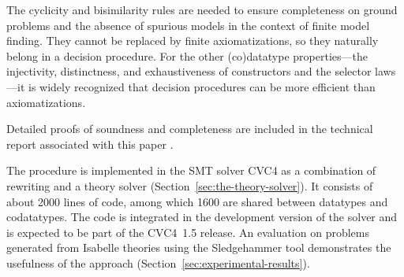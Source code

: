 
The cyclicity and bisimilarity rules are
needed to ensure completeness on ground problems and the absence of spurious
models in the context of finite model finding.
They cannot be replaced by finite
axiomatizations, so they naturally belong in a decision procedure. 
For the other (co)datatype properties---the injectivity, distinctness, and
exhaustiveness of constructors and the selector laws---it is
widely recognized that decision procedures can be more efficient than
axiomatizations.

\begin{paper}
Detailed proofs of soundness and completeness are included in the technical report
associated with this paper \cite{our-report}.
\end{paper}%
The procedure is implemented in the SMT solver CVC4 as a combination
of rewriting and a theory solver
(Section~\ref{sec:the-theory-solver}).
It consists of about 2000 lines of \cpp{} code, among which 1600 are
shared between datatypes and codatatypes. The code is integrated in the
development version of the solver and is expected to be part of the CVC4~1.5 release.
%
An evaluation on %
problems generated from Isabelle theories using the Sledgehammer tool
demonstrates the usefulness of the approach (Section~\ref{sec:experimental-results}).



%




